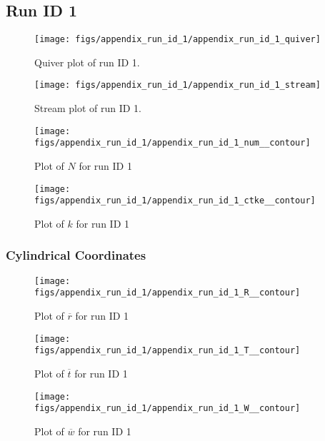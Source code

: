 \subsection{Run ID 1}
\begin{figure}[H]
\centering
\texttt{[image: figs/appendix\_run\_id\_1/appendix\_run\_id\_1\_quiver]}
\caption{Quiver plot of run ID 1.}
\label{fig:appendix_run_id_1_quiver}
\end{figure}


\begin{figure}[H]
\centering
\texttt{[image: figs/appendix\_run\_id\_1/appendix\_run\_id\_1\_stream]}
\caption{Stream plot of run ID 1.}
\label{fig:appendix_run_id_1_stream}
\end{figure}


\begin{figure}[H]
\centering
\texttt{[image: figs/appendix\_run\_id\_1/appendix\_run\_id\_1\_num\_\_contour]}
\caption{Plot of $N$ for run ID 1}
\label{fig:appendix_run_id_1_num__contour}
\end{figure}


\begin{figure}[H]
\centering
\texttt{[image: figs/appendix\_run\_id\_1/appendix\_run\_id\_1\_ctke\_\_contour]}
\caption{Plot of $k$ for run ID 1}
\label{fig:appendix_run_id_1_ctke__contour}
\end{figure}


\subsubsection{Cylindrical Coordinates}
\begin{figure}[H]
\centering
\texttt{[image: figs/appendix\_run\_id\_1/appendix\_run\_id\_1\_R\_\_contour]}
\caption{Plot of $\overline{r}$ for run ID 1}
\label{fig:appendix_run_id_1_R__contour}
\end{figure}


\begin{figure}[H]
\centering
\texttt{[image: figs/appendix\_run\_id\_1/appendix\_run\_id\_1\_T\_\_contour]}
\caption{Plot of $\overline{t}$ for run ID 1}
\label{fig:appendix_run_id_1_T__contour}
\end{figure}


\begin{figure}[H]
\centering
\texttt{[image: figs/appendix\_run\_id\_1/appendix\_run\_id\_1\_W\_\_contour]}
\caption{Plot of $\overline{w}$ for run ID 1}
\label{fig:appendix_run_id_1_W__contour}
\end{figure}



